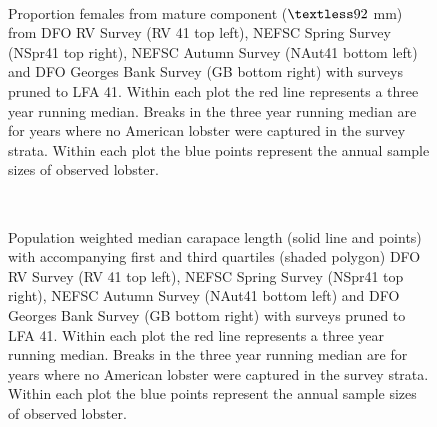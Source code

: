 \documentclass[11pt]{article}
\newcommand{\D}{.}
\newcommand{\e}{/backup/bio_data/bio.lobster/figures/} %
\begin{document}
\begin{figure}
\centering
{}
\\

\caption{Proportion females from mature component ($ \textless 92$ mm) from DFO RV Survey (RV 41 top left), NEFSC Spring Survey (NSpr41 top right), NEFSC Autumn Survey (NAut41 bottom left) and DFO Georges Bank Survey (GB bottom right) with surveys pruned to LFA 41. Within each plot the red line represents a three year running median. Breaks in the three year running median are for years where no American lobster were captured in the survey strata. Within each plot the blue points represent the annual sample sizes of observed lobster.}

\end{figure}
\clearpage




\begin{figure}
\centering
{}
\\

\caption{Population weighted median carapace length (solid line and points) with accompanying first and third quartiles (shaded polygon) DFO RV Survey (RV 41 top left), NEFSC Spring Survey (NSpr41 top right), NEFSC Autumn Survey (NAut41 bottom left) and DFO Georges Bank Survey (GB bottom right) with surveys pruned to LFA 41. Within each plot the red line represents a three year running median. Breaks in the three year running median are for years where no American lobster were captured in the survey strata. Within each plot the blue points represent the annual sample sizes of observed lobster.}
\end{figure}
\clearpage


\end{document}
